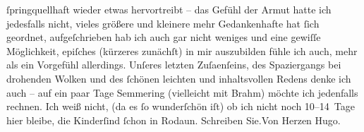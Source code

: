 \begin{ledgroupsized}[t]{13cm}
               ſpringquellhaft wieder etwas {\pb}hervortreibt – das Gefühl der Armut hatte ich jedesfalls nicht, vieles größere und
               kleinere mehr Gedankenhafte hat ſich geordnet, aufgeſchrieben hab ich auch gar nicht
               weniges und eine gewiſſe Möglichkeit, epiſches (kürzeres zunächſt) in mir auszubilden
               fühle ich auch, mehr als ein Vorgefühl {\pb}allerdings. Unſeres letzten Zuſa{\geminationm}enſeins, des Spaziergangs bei drohenden Wolken und des
               ſchönen leichten und inhaltsvollen Redens denke ich auch – auf ein paar Tage Semmering (vielleicht mit Brahm) möchte ich jedenfalls rechnen.\pend
           \pstart
           Ich weiß nicht, (da es ſo wunderſchön iſt) ob ich nicht noch 10–14 Tage hier bleibe,
               die Kinderſind ſchon in Rodaun.\pend
           \pstart
            Schreiben Sie.\hspace*{1.5em}Von Herzen\pend
           \pstart \spacefill\mbox{Hugo.}\pend{}
         
         \endnumbering{}\end{ledgroupsized}  \newcommand{\dateiname}{L01624}\newcommand{\titel}{Hugo von Hofmannsthal an Arthur Schnitzler, 4. [9. 1906]}\newcommand{\editorInnen}{Martin Anton Müller und Gerd-Hermann Susen}
      